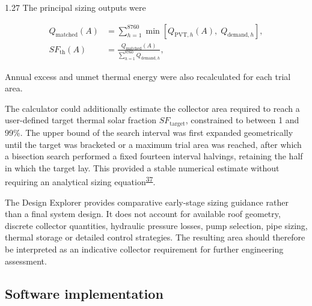 \documentclass[12pt,letterpaper]{article}
\newcommand{\done}{\ \textcolor{green!45!black}{$\checkmark$}} %
\DeclareRobustCommand{\citenum}[1]{\hyperlink{ref:#1}{#1}} %
\begin{document}
\begin{spacing}{1.27}
The principal sizing outputs were

\begin{align}
Q_{\mathrm{matched}}(A) &= \sum_{h=1}^{8760}\min\left[Q_{\mathrm{PVT},h}(A),\; Q_{\mathrm{demand},h}\right], \label{eq:qmatchedA}\\
SF_{\mathrm{th}}(A) &= \frac{Q_{\mathrm{matched}}(A)}{\sum_{h=1}^{8760}Q_{\mathrm{demand},h}}, \label{eq:sfthA}
\end{align}

\noindent Annual excess and unmet thermal energy were also recalculated for each trial area.\par

\vspace{0.15in}

The calculator could additionally estimate the collector area required to reach a user-defined target thermal solar fraction $SF_{\mathrm{target}}$, constrained to between 1 and 99\%. The upper bound of the search interval was first expanded geometrically until the target was bracketed or a maximum trial area was reached, after which a bisection search performed a fixed fourteen interval halvings, retaining the half in which the target lay. This provided a stable numerical estimate without requiring an analytical sizing equation\textsuperscript{\citenum{37}}.\par

\vspace{0.15in}

The Design Explorer provides comparative early-stage sizing guidance rather than a final system design. It does not account for available roof geometry, discrete collector quantities, hydraulic pressure losses, pump selection, pipe sizing, thermal storage or detailed control strategies. The resulting area should therefore be interpreted as an indicative collector requirement for further engineering assessment.\par
\end{spacing}

\subsection[Software implementation\done]{Software implementation}\label{sec33}
\end{document}
